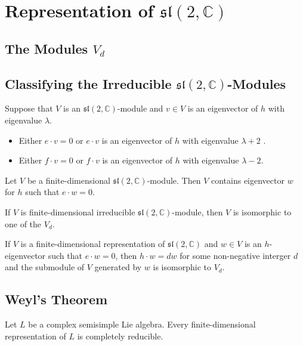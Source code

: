 \documentclass[../main.tex]{subfiles}
\begin{document}
\ifSubfilesClassLoaded{

    
}{}

\chapter{ Representation of \(  \mathfrak{sl}\left( 2,\mathbb{C}  \right)   \)  }

\section{The Modules \(  V_{d}  \) }

\section{Classifying the Irreducible \(  \mathfrak{sl}\left( 2,\mathbb{C}  \right)   \)-Modules }

\begin{lemma}{}{}
    Suppose that \(  V  \) is an \(  \mathfrak{sl}\left( 2,\mathbb{C}  \right)   \)-module and \(  v \in V  \) is an eigenvector of \(  h  \) with eigenvalue \(   \lambda   \).
    \begin{itemize}
        \item Either \(  e\cdot v= 0  \) or \(  e\cdot v  \) is an eigenvector of \(  h  \) with eigenvalue \(   \lambda + 2  \)    .
        \item Either \(  f\cdot v= 0  \) or \(  f\cdot v  \) is an eigenvector of \(  h  \) with eigenvalue \(   \lambda -2  \).    
    \end{itemize}
         
\end{lemma}

\begin{lemma}{}{}
    Let \(  V  \) be a finite-dimensional \(  \mathfrak{sl}\left( 2,\mathbb{C}  \right)   \)-module. Then \(  V  \) contains eigenvector \(  w  \) for \(  h  \) such that \(  e\cdot w= 0  \).      
\end{lemma}

\begin{theorem}{}{}
    If \(  V  \) is finite-dimensional irreducible \(  \mathfrak{sl}\left( 2,\mathbb{C}  \right)   \)-module, then \(  V  \) is isomorphic to one of the \(  V_{d}  \).    
\end{theorem}

\begin{corollary}{}{}
    If \(  V  \) is a finite-dimensional representation of \(  \mathfrak{sl}\left( 2,\mathbb{C}  \right)   \) and \(  w\in V  \) is an  \(  h  \)-eigenvector such that \(  e\cdot w= 0  \), then \(  h\cdot w= dw  \) for some non-negative interger \(  d  \) and the submodule of \(  V  \) generated by \(  w  \) is isomorphic to \(  V_{d}  \).          
\end{corollary}

\section{Weyl's Theorem}

\begin{theorem}{}{}
    Let \(  L  \) be a complex semisimple Lie algebra. Every finite-dimensional representation of \(  L  \) is completely reducible.  
\end{theorem}
\end{document}
